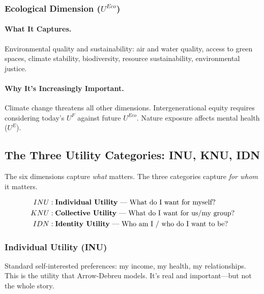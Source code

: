 \subsubsection{Ecological Dimension ($U^{Eco}$)}

\paragraph{What It Captures.}
Environmental quality and sustainability: air and water quality, access to green spaces,
climate stability, biodiversity, resource sustainability, environmental justice.

\paragraph{Why It's Increasingly Important.}
Climate change threatens all other dimensions. Intergenerational equity requires 
considering today's $U^F$ against future $U^{Eco}$. Nature exposure affects mental health ($U^E$).

\subsection{The Three Utility Categories: INU, KNU, IDN}

The six dimensions capture \emph{what} matters.
The three categories capture \emph{for whom} it matters.

\begin{definition}
\begin{align*}
  INU &: \text{\textbf{Individual Utility} --- What do I want for myself?} \\
  KNU &: \text{\textbf{Collective Utility} --- What do I want for us/my group?} \\
  IDN &: \text{\textbf{Identity Utility} --- Who am I / who do I want to be?}
\end{align*}
\end{definition}

\subsubsection{Individual Utility (INU)}

Standard self-interested preferences: my income, my health, my relationships.
This is the utility that Arrow-Debreu models. It's real and important---but not the whole story.


